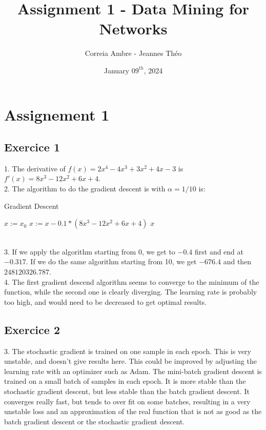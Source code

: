 \documentclass{article}
\title{Assignment 1 - Data Mining for Networks}
\author{Correia Ambre - Jeannes Théo}
\date{January $09^{th}$, 2024}
\begin{document}
    \maketitle


    \section{Assignement 1}\label{sec:assignement-1}

    \subsection{Exercice 1}\label{subsec:exercice-1}
    1. The derivative of $f(x) = 2x^4 - 4x^3 + 3x^2 + 4x - 3$ is $f'(x) = 8x^3 - 12x^2 + 6x + 4$. \\
    2. The algorithm to do the gradient descent is with $\alpha = 1/10$ is:\\
    \begin{algorithm}
        \caption{Gradient Descent}\label{alg:algorithm}
        \begin{algorithmic}
            \STATE $x := x_0$
            \STATE $x := x - 0.1 * (8x^3 - 12x^2 + 6x + 4)$
            \ENDWHILE
            \RETURN $x$
        \end{algorithmic}
    \end{algorithm} \\
    3. If we apply the algorithm starting from 0, we get to $-0.4$ first and end at $-0.317$.
    If we do the same algorithm starting from 10, we get $-676.4$ and then $248120326.787$. \\
    4. The first gradient descend algorithm seems to converge to the minimum of the function, while the second one is clearly diverging.
    The learning rate is probably too high, and would need to be decreased to get optimal results.

    \subsection{Exercice 2}\label{subsec:exercice-2}

    3. The stochastic gradient is trained on one sample in each epoch.
    This is very unstable, and doesn't give results here.
    This could be improved by adjusting the learning rate with an optimizer such as Adam.
    The mini-batch gradient descent is trained on a small batch of samples in each epoch.
    It is more stable than the stochastic gradient descent, but less stable than the batch gradient descent.
    It converges really fast, but tends to over fit on some batches, resulting in a very unstable loss and an
    approximation of the real function that is not as good as the batch gradient descent or the stochastic gradient descent. \\
\end{document}
